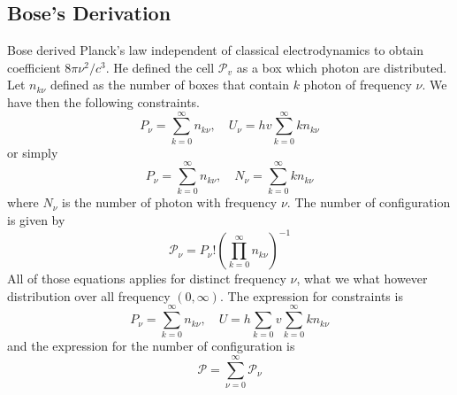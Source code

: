 \documentclass[../../../Main.tex]{subfiles}
\begin{document}
\subsection{Bose's Derivation}
Bose derived Planck's law independent of classical electrodynamics to obtain coefficient $8\pi \nu^2/c^3$. He defined the cell $\mathcal{P}_v$ as a box which photon are distributed. Let $n_{k\nu}$ defined as the number of boxes that contain $k$ photon of frequency $\nu$. We have then the following constraints.
\begin{equation*}
    P_\nu=\sum_{k=0}^{\infty}n_{k\nu},\quad U_\nu= hv\sum_{k=0}^{\infty}kn_{k\nu}
\end{equation*}
or simply
\begin{equation*}
    P_\nu=\sum_{k=0}^{\infty}n_{k\nu},\quad N_\nu= \sum_{k=0}^{\infty} kn_{k\nu}
\end{equation*}
where $N_\nu$ is the number of photon with frequency $\nu$. The number of configuration is given by 
\begin{equation*}
    \mathcal{P}_\nu=P_\nu!\left(\prod_{k=0}^{\infty}n_{k\nu}\right)^{-1}
\end{equation*}  
All of those equations applies for distinct frequency $\nu$, what we what however distribution over all frequency $(0,\infty)$. The expression for constraints is
\begin{equation*}
    P_\nu=\sum_{k=0}^{\infty}n_{k\nu},\quad U= h\sum_{k=0}v\sum_{k=0}^{\infty}kn_{k\nu}
\end{equation*}
and the expression for the number of configuration is 
\begin{equation*}
    \mathcal{P}=\sum_{\nu=0}^{\infty}\mathcal{P}_\nu
\end{equation*} 
\end{document}
